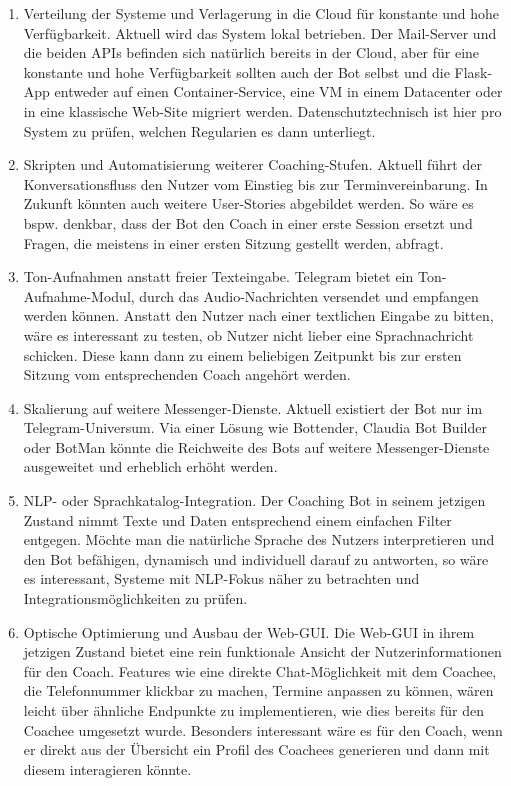     \begin{enumerate}
        \item Verteilung der Systeme und Verlagerung in die Cloud für konstante und hohe Verfügbarkeit. Aktuell wird das System lokal betrieben. Der Mail-Server und die beiden APIs befinden sich natürlich bereits in der Cloud, aber für eine konstante und hohe Verfügbarkeit sollten auch der Bot selbst und die Flask-App entweder auf einen Container-Service, eine VM in einem Datacenter oder in eine klassische Web-Site migriert werden. Datenschutztechnisch ist hier pro System zu prüfen, welchen Regularien es dann unterliegt. 
        \item Skripten und Automatisierung weiterer Coaching-Stufen. Aktuell führt der Konversationsfluss den Nutzer vom Einstieg bis zur Terminvereinbarung. In Zukunft könnten auch weitere User-Stories abgebildet werden. So wäre es bspw. denkbar, dass der Bot den Coach in einer erste Session ersetzt und Fragen, die meistens in einer ersten Sitzung gestellt werden, abfragt.
        \item Ton-Aufnahmen anstatt freier Texteingabe. Telegram bietet ein Ton-Aufnahme-Modul, durch das Audio-Nachrichten versendet und empfangen werden können. Anstatt den Nutzer nach einer textlichen Eingabe zu bitten, wäre es interessant zu testen, ob Nutzer nicht lieber eine Sprachnachricht schicken. Diese kann dann zu einem beliebigen Zeitpunkt bis zur ersten Sitzung vom entsprechenden Coach angehört werden.
        \item Skalierung auf weitere Messenger-Dienste. Aktuell existiert der Bot nur im Telegram-Universum. Via einer Lösung wie Bottender, Claudia Bot Builder oder BotMan könnte die Reichweite des Bots auf weitere Messenger-Dienste ausgeweitet und erheblich erhöht werden.
        \item NLP- oder Sprachkatalog-Integration. Der Coaching Bot in seinem jetzigen Zustand nimmt Texte und Daten entsprechend einem einfachen Filter entgegen. Möchte man die natürliche Sprache des Nutzers interpretieren und den Bot befähigen, dynamisch und individuell darauf zu antworten, so wäre es interessant, Systeme mit NLP-Fokus näher zu betrachten und Integrationsmöglichkeiten zu prüfen. 
        \item Optische Optimierung und Ausbau der Web-GUI. Die Web-GUI in ihrem jetzigen Zustand bietet eine rein funktionale Ansicht der Nutzerinformationen für den Coach. Features wie eine direkte Chat-Möglichkeit mit dem Coachee, die Telefonnummer klickbar zu machen, Termine anpassen zu können, wären leicht über ähnliche Endpunkte zu implementieren, wie dies bereits für den Coachee umgesetzt wurde. Besonders interessant wäre es für den Coach, wenn er direkt aus der Übersicht ein Profil des Coachees generieren und dann mit diesem interagieren könnte.
        
    \end{enumerate}
